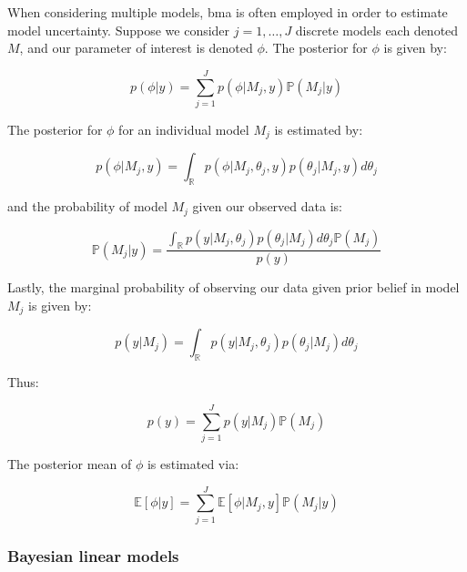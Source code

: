 \documentclass{report}
\begin{document}
When considering multiple models, \gls{bma} is often employed in order to estimate model uncertainty. Suppose we consider $j = 1, \dots, J$ discrete models each denoted $M$, and our parameter of interest is denoted $\phi$. The posterior for $\phi$ is given by:

\begin{equation}\label{eq:ols-bayes-bma-phi-posterior}
    p(\phi | y) = \sum_{j=1}^J p(\phi | M_j, y) \mathbb{P}(M_j | y)
\end{equation}

The posterior for $\phi$ for an individual model $M_j$ is estimated by:

\begin{equation}\label{eq:ols-bayes-bma-phi-posterior-individual}
    p(\phi | M_j, y) = \int_{\mathbb{R}} p(\phi | M_j, \theta_j, y) p(\theta_j | M_j, y) d\theta_j
\end{equation}

and the probability of model $M_j$ given our observed data is:

\begin{equation}\label{eq:ols-bayes-bma-model-prob}
    \mathbb{P}(M_j | y) = \frac{\int_{\mathbb{R}} p(y | M_j, \theta_j)p(\theta_j | M_j) d\theta_j \mathbb{P}(M_j)}{p(y)}
\end{equation}

Lastly, the marginal probability of observing our data given prior belief in model $M_j$ is given by:

\begin{equation}\label{eq:ols-bayes-bma-data-prob}
    p(y | M_j) = \int_{\mathbb{R}} p(y | M_j, \theta_j) p(\theta_j | M_j) d\theta_j
\end{equation}

Thus:

\begin{equation}\label{eq:ols-bayes-bma-y-prob}
    p(y) = \sum_{j=1}^J p(y | M_j) \mathbb{P}(M_j)
\end{equation}

The posterior mean of $\phi$ is estimated via:

\begin{equation}\label{eq:ols-bayes-bma-phi-posterior-mean}
    \mathbb{E}[\phi | y] = \sum_{j=1}^J \mathbb{E}[\phi | M_j, y] \mathbb{P}(M_j | y)
\end{equation}

\subsubsection{Bayesian linear models}
\end{document}
